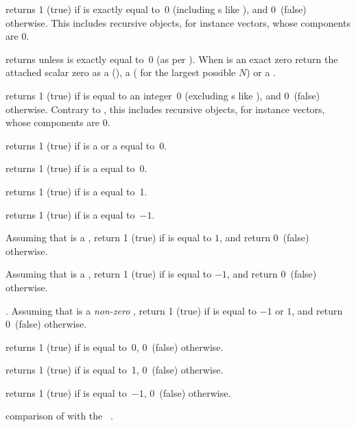 
 returns 1 (true) if  is exactly equal
to~0 (including s like ), and 0~(false) otherwise.
This includes recursive objects, for instance vectors, whose components are $0$.

 returns  unless  is exactly
equal to~0 (as per ). When  is an exact zero
return the attached scalar zero as a  (),
a  ( for the largest possible $N$) or a
.

 returns 1 (true) if  is equal
to an integer~0 (excluding s like ), and 0~(false)
otherwise. Contrary to , this includes recursive objects, for
instance vectors, whose components are $0$.

 returns 1 (true) if  is a  or
a  equal to~0.

 returns 1 (true) if  is a 
equal to~0.

 returns 1 (true) if  is a 
equal to~1.

 returns 1 (true) if  is a 
equal to~$-1$.

Assuming that  is a , return 1 (true) if  is equal to
$1$, and return 0~(false) otherwise.

Assuming that  is a , return 1 (true) if  is equal to
$-1$, and return 0~(false) otherwise.

. Assuming that  is a
\emph{non-zero} , return 1 (true) if  is equal to $-1$ or
$1$, and return 0~(false) otherwise.

 returns 1 (true) if  is equal to~0, 0~(false)
otherwise.

 returns 1 (true) if  is equal to~1, 0~(false)
otherwise.

 returns 1 (true) if  is equal to~$-1$,
0~(false) otherwise.



 comparison of  with the
~.

